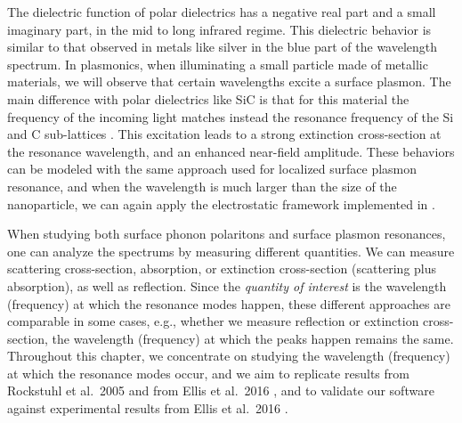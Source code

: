 The dielectric function of polar dielectrics has a negative real part and a small imaginary part, in the mid to long infrared regime. 
This dielectric behavior is similar to that observed in metals like silver in the blue part of the wavelength spectrum. 
In plasmonics, when illuminating a small particle made of metallic materials, we will observe that certain wavelengths excite a surface plasmon. 
The main difference with polar dielectrics like SiC is that for this material the frequency of the incoming light matches instead the resonance 
frequency of the Si and C sub-lattices \cite{caldwell2015,rockstuhl2005}. This excitation leads to a strong extinction cross-section at the 
resonance wavelength, and an enhanced near-field amplitude. These behaviors can be modeled with the same approach used for localized surface plasmon 
resonance, and when the wavelength is much larger than the size of the nanoparticle, we can again apply the electrostatic framework 
implemented in \pygbe \cite{ClementiETal2017, ClementiETal2019}.

When studying both surface phonon polaritons and surface plasmon resonances, one can analyze the spectrums by measuring different quantities. 
We can measure scattering cross-section, absorption, or extinction cross-section (scattering plus absorption), as well as reflection. 
Since the \textit{quantity of interest} is the wavelength (frequency) at which the resonance modes happen, 
these different approaches are comparable in some cases, e.g., whether we measure reflection or extinction cross-section, the 
wavelength (frequency) at which the peaks happen remains the same. Throughout this chapter, we concentrate on studying the wavelength 
(frequency) at which the resonance modes occur, and we aim to replicate results from Rockstuhl et al.\ 2005 \cite{rockstuhl2005} and from 
Ellis et al.\ 2016 \cite{ellis2016}, and to validate our software against experimental results from Ellis et al.\ 2016 \cite{ellis2016}.
